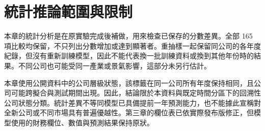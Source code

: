 \section{統計推論範圍與限制}

本章的統計分析是在原實驗完成後補做，用來檢查已保存的分數差異。全部 165 項比較均保留，不只列出分數增加或達到顯著者。重抽樣一起保留同公司的各年度紀錄，但沒有重新訓練模型，因此不能代表換一批訓練資料或換到其他年份時的結果。不同公司也可能受同一產業或景氣影響，這部分未另行估計。

本章使用公開資料中的公司層級狀態，該標籤在同一公司所有年度保持相同，且公司可能跨擬合與測試期間出現。因此，結論限於本資料與既定時間分區下的回溯性公司狀態分類。統計差異不等同模型已具備提前一年預測能力，也不能據此宣稱對全新公司或不同市場具有普遍優越性。第三章的欄位表已依實際發布版修正，但模型使用的財務欄位、數值與預測結果保持原狀。
\endgroup
